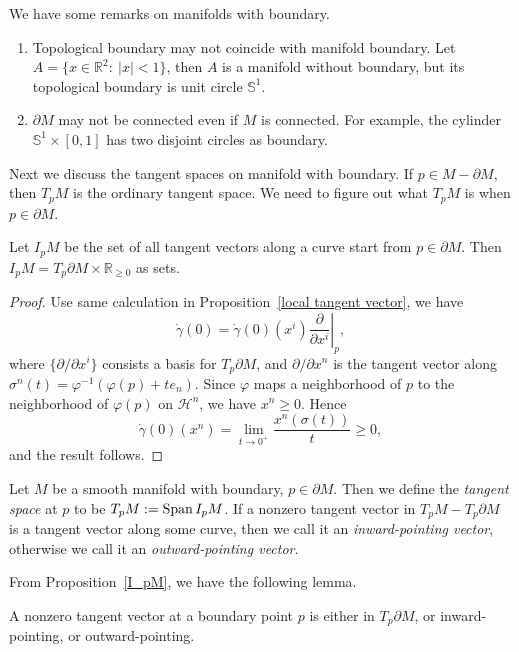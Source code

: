 \begin{rem}We have some remarks on manifolds with boundary.
    \begin{enumerate}[(1)]
        \item Topological boundary may not coincide with manifold boundary.
        Let $A=\{x\in\mathbb{R}^2:\ |x|<1\}$, then $A$ is a manifold without boundary, but its topological boundary is unit circle $\mathbb{S}^1$.
        \item $\partial M$ may not be connected even if $M$ is connected.
        For example, the cylinder $\mathbb{S}^1\times[0,1]$ has two disjoint circles as boundary.
    \end{enumerate}
\end{rem}

Next we discuss the tangent spaces on manifold with boundary.
If $p\in M-\partial M$, then $T_pM$ is the ordinary tangent space.
We need to figure out what $T_pM$ is when $p\in\partial M$.

\begin{prop}\label{I_pM}
    Let $I_pM$ be the set of all tangent vectors along a curve start from $p\in\partial M$.
    Then $I_pM=T_p\partial M\times\mathbb{R}_{\geq 0}$ as sets.
\end{prop}
\begin{proof}
    Use same calculation in Proposition~\ref{local tangent vector}, we have
    \[\dot\gamma(0)=\dot\gamma(0)(x^i)\left.\frac{\partial}{\partial{x^i}}\right|_p,\]
    where $\{\partial/\partial{x^i}\}$ consists a basis for $T_p\partial M$, and $\partial/\partial{x^n}$ is the tangent vector along $\sigma^n(t)=\varphi^{-1}(\varphi(p)+te_n)$.
    Since $\varphi$ maps a neighborhood of $p$ to the neighborhood of $\varphi(p)$ on $\mathcal{H}^n$, we have $x^n\geq 0$.
    Hence
    \[\dot\gamma(0)(x^n)=\lim_{t\to 0^+}\frac{x^n(\sigma(t))}{t}\geq 0,\]
    and the result follows.
\end{proof}

\begin{defn}
    Let $M$ be a smooth manifold with boundary, $p\in\partial M$.
    Then we define the \emph{tangent space} at $p$ to be $T_pM:=\operatorname{Span}{I_pM}$.
    If a nonzero tangent vector in $T_pM-T_p\partial M$ is a tangent vector along some curve, then we call it an \emph{inward-pointing vector}, otherwise we call it an \emph{outward-pointing vector}.
\end{defn}

From Proposition~\ref{I_pM}, we have the following lemma.
\begin{lem}
    A nonzero tangent vector at a boundary point $p$ is either in $T_p\partial M$, or inward-pointing, or outward-pointing.
\end{lem}

